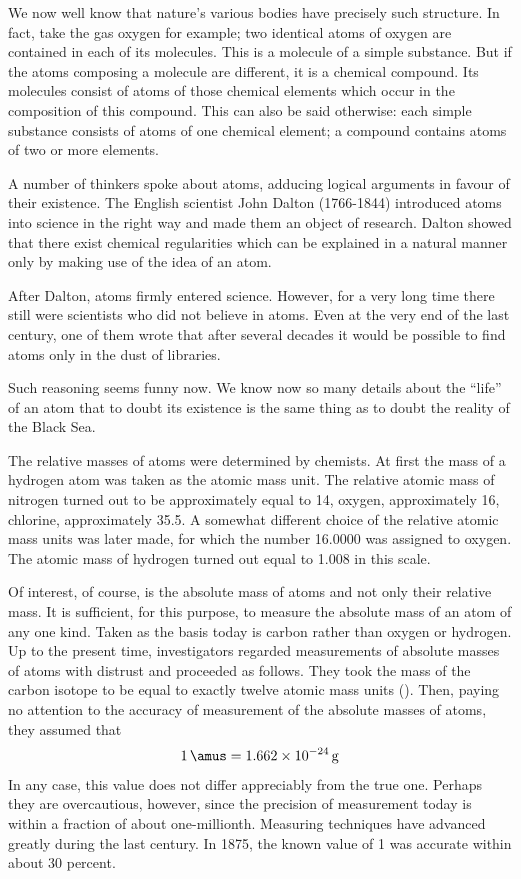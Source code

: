 We now well know that nature’s various bodies have precisely such structure. In fact, take the gas oxygen for example; two identical atoms of oxygen are contained in each of its molecules. This is a molecule of a simple substance. But if the atoms composing a molecule are different, it is a chemical compound. Its molecules consist of atoms of those chemical elements which occur in the composition of this compound. This can also be said otherwise: each simple substance consists of atoms of one chemical element; a compound contains atoms of two or more elements.


A number of thinkers spoke about atoms, adducing logical arguments in favour of their existence. The English scientist John Dalton (1766-1844) introduced atoms into science in the right way and made them an object of research. Dalton showed that there exist chemical regularities which can be explained in a natural manner only by making use of the idea of an atom.

After Dalton, atoms firmly entered science. However, for a very long time there still were scientists who did not believe in atoms. Even at the very end of the last century, one of them wrote that after several decades it would be possible to find atoms only in the dust of libraries.

Such reasoning seems funny now. We know now so many details about the ``life'' of an atom that to doubt its existence is the same thing as to doubt the reality of the Black Sea.

The relative masses of atoms were determined by chemists. At first the mass of a hydrogen atom was taken as the atomic mass unit. The relative atomic mass of nitrogen turned out to be approximately equal to 14, oxygen, approximately 16, chlorine, approximately 35.5. A somewhat different choice of the relative atomic mass units was later made, for which the number 16.0000 was assigned to oxygen. The atomic mass of hydrogen turned out equal to 1.008 in this scale.

Of interest, of course, is the absolute mass of atoms and not only their relative mass. It is sufficient, for this purpose, to measure the absolute mass of an atom of any one kind. Taken as the basis today is carbon rather than oxygen or hydrogen. Up to the present time, investigators regarded measurements of absolute masses of atoms with distrust and proceeded as follows. They took the mass of the carbon isotope  to be equal to exactly twelve atomic mass units (\si{\amus}). Then, paying no attention to the accuracy of measurement of the absolute masses of atoms, they assumed that
\begin{equation*}%
\SI{1}{\amus} = \SI{1.662e-24}{\gram}
\end{equation*}
In any case, this value does not differ appreciably from the true one. Perhaps they are overcautious, however, since the precision of measurement today is within a fraction of about one-millionth. Measuring techniques have advanced greatly during the last century. In 1875, the known value of \SI{1}{\amus} was accurate within about 30 percent.

